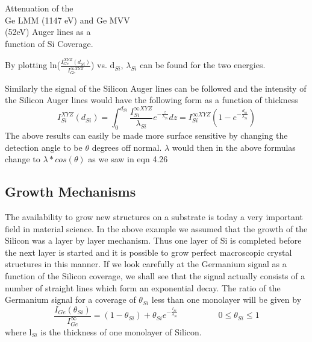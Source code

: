            Attenuation of the\\ Ge LMM  (1147
          eV) and Ge MVV\\ (52eV)  Auger  lines  as  a\\  function  of  Si
          Coverage.\\

                      \vspace{9cm}

          By plotting ln($\frac{I^{XYZ}_{Ge}(d_{Si})}{I^{\infty    XYZ}_{Ge}}$)
          vs. d$_{Si}$,  $\lambda_{Si}$  can  be  found  for  the  two
          energies.

             Similarly the signal of the  Silicon  Auger lines  can  be
          followed and the intensity of the Silicon Auger lines  would
          have the following form as a function of  thickness
          \begin{equation}
          I^{XYZ}_{Si}(d_{Si})=\int_{0}^{d_{Si}}\frac{I^{\infty
          XYZ}_{Si}}{\lambda_{Si}}e^{-\frac{z}{\lambda_{Si}}}dz=I^{\infty
          XYZ}_{Si}(1-e^{-\frac{d_{Si}}{\lambda_{Si}}})
          \end{equation}
          The above results can easily be made more surface  sensitive
          by changing the detection angle to be $\theta$  degrees  off
          normal. $\lambda$ would then in the above formulas change to
          $\lambda*cos(\theta)$ as we saw in eqn 4.26

          \subsection{Growth Mechanisms}

          The availability to grow new structures on a substrate is today
          a very important field in material  science.  In  the  above
          example we assumed that the growth  of  the  Silicon  was  a
          layer by layer mechanism. Thus one layer of Si is  completed
          before the next layer is started and it is possible to  grow
          perfect macroscopic crystal structures in this manner. If  we
          look carefully at the Germanium signal as a  function  of  the
          Silicon coverage, we  shall  see  that  the  signal  actually
          consists  of  a  number  of  straight   lines   which   form
          an exponential decay. The ratio of the Germanium signal for a
          coverage of $\theta_{Si}$ less than one  monolayer  will  be
          given                  by                   \begin{equation}
          \frac{I_{Ge}(\theta_{Si})}{I_{Ge}^{\infty}}                =
          (1-\theta_{Si})+\theta_{Si}e^{-\frac{l_{Si}}{\lambda_{Si}}}
          \hspace{2cm} 0\leq \theta_{Si} \leq 1  \end{equation}  where
          l$_{Si}$ is the thickness of one monolayer of Silicon.

